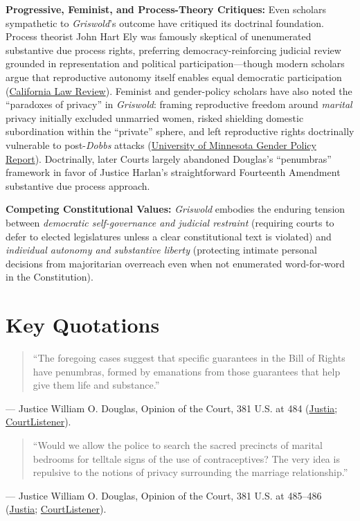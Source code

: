 \documentclass[12pt]{article}
\begin{document}
\textbf{Progressive, Feminist, and Process-Theory Critiques:} Even scholars sympathetic to \textit{Griswold}'s outcome have critiqued its doctrinal foundation. Process theorist John Hart Ely was famously skeptical of unenumerated substantive due process rights, preferring democracy-reinforcing judicial review grounded in representation and political participation---though modern scholars argue that reproductive autonomy itself enables equal democratic participation (\href{https://www.californialawreview.org/print/democracy-promoting-review}{California Law Review}). Feminist and gender-policy scholars have also noted the ``paradoxes of privacy'' in \textit{Griswold}: framing reproductive freedom around \textit{marital} privacy initially excluded unmarried women, risked shielding domestic subordination within the ``private'' sphere, and left reproductive rights doctrinally vulnerable to post-\textit{Dobbs} attacks (\href{https://genderpolicyreport.umn.edu/privacy-matters-the-legacy-of-griswold/}{University of Minnesota Gender Policy Report}). Doctrinally, later Courts largely abandoned Douglas's ``penumbras'' framework in favor of Justice Harlan's straightforward Fourteenth Amendment substantive due process approach.

\textbf{Competing Constitutional Values:} \textit{Griswold} embodies the enduring tension between \textit{democratic self-governance and judicial restraint} (requiring courts to defer to elected legislatures unless a clear constitutional text is violated) and \textit{individual autonomy and substantive liberty} (protecting intimate personal decisions from majoritarian overreach even when not enumerated word-for-word in the Constitution).

\section{Key Quotations}
\begin{quote}
``The foregoing cases suggest that specific guarantees in the Bill of Rights have penumbras, formed by emanations from those guarantees that help give them life and substance.''
\end{quote}
\noindent--- Justice William O. Douglas, Opinion of the Court, 381 U.S. at 484 (\href{https://supreme.justia.com/cases/federal/us/381/479/}{Justia}; \href{https://www.courtlistener.com/opinion/107082/griswold-v-connecticut/}{CourtListener}).

\begin{quote}
``Would we allow the police to search the sacred precincts of marital bedrooms for telltale signs of the use of contraceptives? The very idea is repulsive to the notions of privacy surrounding the marriage relationship.''
\end{quote}
\noindent--- Justice William O. Douglas, Opinion of the Court, 381 U.S. at 485--486 (\href{https://supreme.justia.com/cases/federal/us/381/479/}{Justia}; \href{https://www.courtlistener.com/opinion/107082/griswold-v-connecticut/}{CourtListener}).
\end{document}
